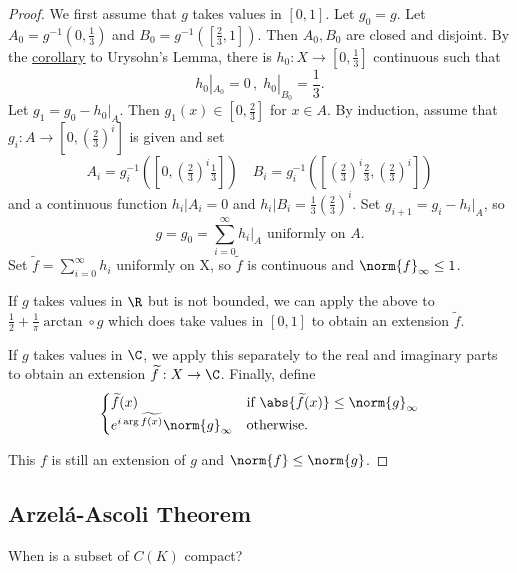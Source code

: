 \documentclass{article}
\begin{document}
\begin{proof}We first assume that $g$ takes values in $[0, 1]$. Let $g_0 = g$.
    Let $A_0 = g^{-1}(0, \frac{1}{3})$ and $B_0 = g^{-1}([\frac{2}{3}, 1])$. Then $A_0, B_0$ are closed and disjoint.
    By the \hyperlink{cor:urysohnCor}{corollary} to Urysohn's Lemma, there is $h_0: X \to [0, \frac{1}{3}]$ continuous such that
    \begin{equation*}
        h_0|_{A_0} = 0 \, , \; h_0|_{B_0} = \frac{1}{3}.
    \end{equation*}
    Let $g_1 = g_0 - h_0|_A$. Then $g_1(x) \in [0, \frac{2}{3}]$ for $x \in A$.
    By induction, assume that $g_i: A \to [0, (\frac{2}{3})^i]$ is given and set
    \begin{equation*}
        A_i = g_i^{-1} \left(\left[0, \left(\tfrac{2}{3}\right)^i \tfrac{1}{3}\right]\right) \quad B_i = g_i^{-1} \left(\left[\left(\tfrac{2}{3}\right)^i \tfrac{2}{3}, \left(\tfrac{2}{3}\right)^i \right]\right)
    \end{equation*}
    and a continuous function $h_i|A_i = 0$ and $h_i|B_i = \frac{1}{3} (\frac{2}{3})^i$. Set $g_{i+1} = g_i - h_i|_A$, so
    \begin{equation*}
        g = g_0 = \sum_{i=0}^\infty h_i|_A \text{ uniformly on } A.
    \end{equation*}
    Set $\widetilde{f} = \sum_{i=0}^\infty h_i$ uniformly on X, so $\widetilde{f}$ is continuous and $\norm{f}_\infty \leq 1$.

    If $g$ takes values in $\R$ but is not bounded, we can apply the above to $\frac{1}{2} + \frac{1}{\pi} \arctan \circ g$ which does take values in $[0, 1]$ to obtain an extension $\widetilde{f}$.

    If $g$ takes values in $\C$, we apply this separately to the real and imaginary parts to obtain an extension $\widetilde{f}:X \to \C$.
    Finally, define
    \begin{equation*}
        \begin{cases}
            \widetilde{f}(x) & \text{if } \abs{\widetilde{f}(x)} \leq \norm{g}_\infty \\
            e^{i \arg \widetilde{f(x)}} \norm{g}_\infty & \text{otherwise.}
        \end{cases}
    \end{equation*}

    This $f$ is still an extension of $g$ and $\norm{f} \leq \norm{g}$.
\end{proof}

\subsection{Arzel\'a-Ascoli Theorem}
When is a subset of $C(K)$ compact?
\end{document}
